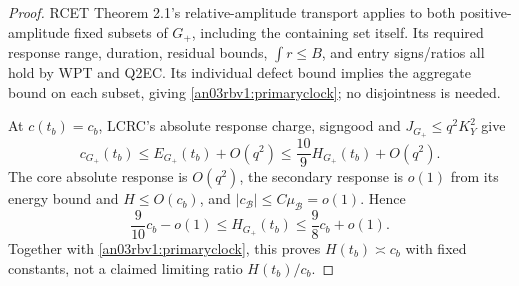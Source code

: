 \documentclass[11pt]{article}
\numberwithin{equation}{section}
\theoremstyle{remark}\newtheorem{remark}[theorem]{Remark}
\newcommand{\BB}{\mathcal B}
\newcommand{\Gp}{G_+}
\begin{document}
\begin{proof}
RCET Theorem 2.1's relative-amplitude transport applies to both
positive-amplitude fixed subsets of $\Gp$, including the containing
set itself. Its required response range, duration, residual bounds,
$\int r\le B$, and entry signs/ratios all hold by WPT and Q2EC.
Its individual defect bound implies the aggregate bound on each
subset, giving \eqref{an03rbv1:primaryclock}; no disjointness is needed.

At $c(t_b)=c_b$, LCRC's absolute response charge, signgood and
$J_{\Gp}\le q^2K_Y^2$ give
\[
 c_{\Gp}(t_b)\le E_{\Gp}(t_b)+O(q^2)
                 \le\frac{10}{9}H_{\Gp}(t_b)+O(q^2).
\]
The core absolute response is $O(q^2)$, the secondary response
is $o(1)$ from its energy bound and $H\le O(c_b)$, and
$|c_{\BB}|\le C\mu_{\BB}=o(1)$. Hence
\begin{equation}
 \frac9{10}c_b-o(1)\le H_{\Gp}(t_b)
                  \le\frac98c_b+o(1).
 \label{an03rbv1:terminalprimary}
\end{equation}
Together with \eqref{an03rbv1:primaryclock}, this proves
$H(t_b)\asymp c_b$ with fixed constants, not a claimed limiting
ratio $H(t_b)/c_b$.
\end{proof}
\end{document}
